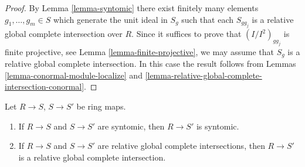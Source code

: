 \begin{proof}
By Lemma \ref{lemma-syntomic} there exist finitely many elements
$g_1, \ldots, g_m \in S$ which generate the unit ideal in $S_g$
such that each $S_{gg_j}$ is a relative global complete intersection
over $R$. Since it suffices to prove that $(I/I^2)_{gg_j}$ is
finite projective, see
Lemma \ref{lemma-finite-projective},
we may assume that $S_g$ is a relative global complete intersection.
In this case the result follows from
Lemmas \ref{lemma-conormal-module-localize} and
\ref{lemma-relative-global-complete-intersection-conormal}.
\end{proof}

\begin{lemma}
\label{lemma-composition-syntomic}
Let $R \to S$, $S \to S'$ be ring maps.
\begin{enumerate}
\item If $R \to S$ and $S \to S'$ are syntomic, then $R \to S'$
is syntomic.
\item If $R \to S$ and $S \to S'$ are relative global complete intersections,
then $R \to S'$ is a relative global complete intersection.
\end{enumerate}
\end{lemma}

